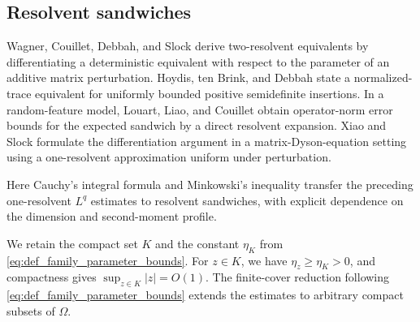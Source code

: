 \documentclass[EJP, preprint, NODS, nobera, nofontexpansion]{ejpecp}
\begin{document}
\subsection{Resolvent sandwiches}
\label{sec:linear_response_superoperator}

Wagner, Couillet, Debbah, and Slock
\cite{WagnerCouilletDebbahSlock2012} derive two-resolvent equivalents
by differentiating a deterministic equivalent with respect to the
parameter of an additive matrix perturbation.
Hoydis, ten Brink, and Debbah \cite{HOY13} state a normalized-trace
equivalent for uniformly bounded positive semidefinite insertions.
In a random-feature model, Louart, Liao, and Couillet
\cite{LOU17b} obtain operator-norm error bounds for the expected
sandwich by a direct resolvent expansion.
Xiao and Slock \cite{XiaoSlock2026} formulate the differentiation
argument in a matrix-Dyson-equation setting using a one-resolvent
approximation uniform under perturbation.

Here Cauchy's integral formula and Minkowski's inequality transfer
the preceding one-resolvent \(L^q\) estimates to resolvent sandwiches,
with explicit dependence on the dimension and second-moment profile.

We retain the compact set $K$ and the constant $\eta_K$ from
\eqref{eq:def_family_parameter_bounds}. For $z\in K$, we have
$\eta_z\geq\eta_K>0$, and compactness gives
$\sup_{z\in K}|z|=O(1)$.
The finite-cover reduction following
\eqref{eq:def_family_parameter_bounds} extends the estimates to
arbitrary compact subsets of $\Omega$.
\end{document}
